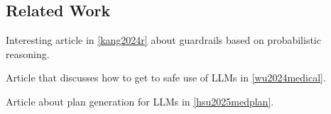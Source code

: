 %

\subsection{Related Work}
Interesting article in \ref{kang2024r} about guardrails based on probabilistic reasoning.

Article that discusses how to get to safe use of LLMs in \ref{wu2024medical}.

Article about plan generation for LLMs in \ref{hsu2025medplan}.